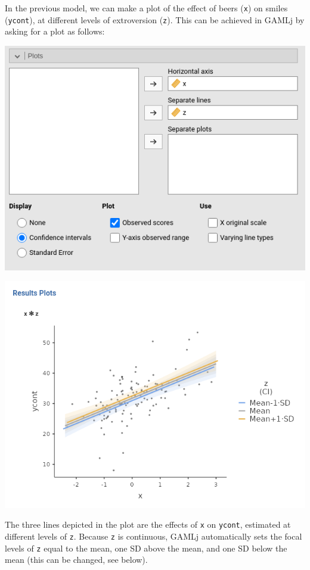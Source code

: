 \documentclass[
]{book}
\begin{document}
In the previous model, we can make a plot of the effect of beers (\texttt{x}) on smiles (\texttt{ycont}), at different levels of extroversion (\texttt{z}). This can be achieved in {GAMLj} by asking for a plot as follows:

\includegraphics[width=7.81in]{bookletpics/2_input10}

\includegraphics[width=8.92in]{bookletpics/2_output10}

The three lines depicted in the plot are the effects of \texttt{x} on \texttt{ycont}, estimated at different levels of \texttt{z}. Because \texttt{z} is continuous, {GAMLj} automatically sets the focal levels of \texttt{z} equal to the mean, one SD above the mean, and one SD below the mean (this can be changed, see below).
\end{document}
